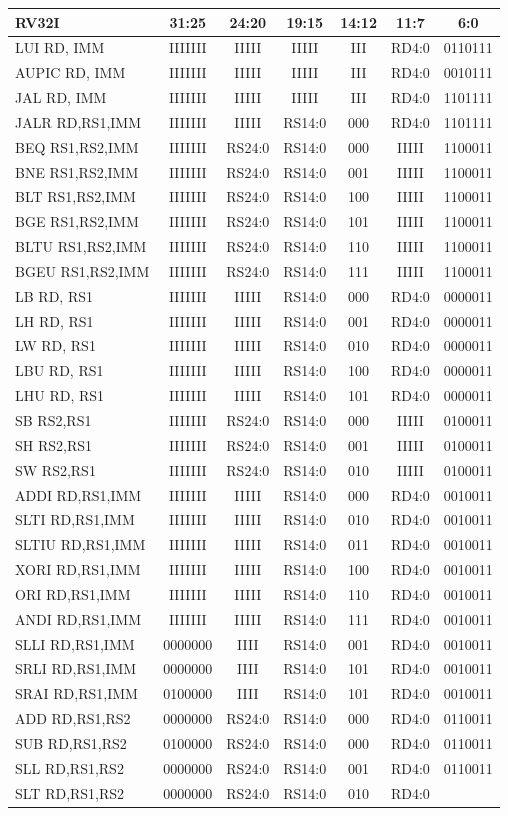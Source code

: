 \documentclass[
]{article}
\begin{document}
\begin{longtable}[]{@{}lcccccc@{}}
\toprule
RV32I & 31:25 & 24:20 & 19:15 & 14:12 & 11:7 & 6:0\tabularnewline
\midrule
\endhead
LUI RD, IMM & IIIIIII & IIIII & IIIII & III & RD4:0 &
0110111\tabularnewline
AUPIC RD, IMM & IIIIIII & IIIII & IIIII & III & RD4:0 &
0010111\tabularnewline
JAL RD, IMM & IIIIIII & IIIII & IIIII & III & RD4:0 &
1101111\tabularnewline
JALR RD,RS1,IMM & IIIIIII & IIIII & RS14:0 & 000 & RD4:0 &
1101111\tabularnewline
BEQ RS1,RS2,IMM & IIIIIII & RS24:0 & RS14:0 & 000 & IIIII &
1100011\tabularnewline
BNE RS1,RS2,IMM & IIIIIII & RS24:0 & RS14:0 & 001 & IIIII &
1100011\tabularnewline
BLT RS1,RS2,IMM & IIIIIII & RS24:0 & RS14:0 & 100 & IIIII &
1100011\tabularnewline
BGE RS1,RS2,IMM & IIIIIII & RS24:0 & RS14:0 & 101 & IIIII &
1100011\tabularnewline
BLTU RS1,RS2,IMM & IIIIIII & RS24:0 & RS14:0 & 110 & IIIII &
1100011\tabularnewline
BGEU RS1,RS2,IMM & IIIIIII & RS24:0 & RS14:0 & 111 & IIIII &
1100011\tabularnewline
LB RD, RS1 & IIIIIII & IIIII & RS14:0 & 000 & RD4:0 &
0000011\tabularnewline
LH RD, RS1 & IIIIIII & IIIII & RS14:0 & 001 & RD4:0 &
0000011\tabularnewline
LW RD, RS1 & IIIIIII & IIIII & RS14:0 & 010 & RD4:0 &
0000011\tabularnewline
LBU RD, RS1 & IIIIIII & IIIII & RS14:0 & 100 & RD4:0 &
0000011\tabularnewline
LHU RD, RS1 & IIIIIII & IIIII & RS14:0 & 101 & RD4:0 &
0000011\tabularnewline
SB RS2,RS1 & IIIIIII & RS24:0 & RS14:0 & 000 & IIIII &
0100011\tabularnewline
SH RS2,RS1 & IIIIIII & RS24:0 & RS14:0 & 001 & IIIII &
0100011\tabularnewline
SW RS2,RS1 & IIIIIII & RS24:0 & RS14:0 & 010 & IIIII &
0100011\tabularnewline
ADDI RD,RS1,IMM & IIIIIII & IIIII & RS14:0 & 000 & RD4:0 &
0010011\tabularnewline
SLTI RD,RS1,IMM & IIIIIII & IIIII & RS14:0 & 010 & RD4:0 &
0010011\tabularnewline
SLTIU RD,RS1,IMM & IIIIIII & IIIII & RS14:0 & 011 & RD4:0 &
0010011\tabularnewline
XORI RD,RS1,IMM & IIIIIII & IIIII & RS14:0 & 100 & RD4:0 &
0010011\tabularnewline
ORI RD,RS1,IMM & IIIIIII & IIIII & RS14:0 & 110 & RD4:0 &
0010011\tabularnewline
ANDI RD,RS1,IMM & IIIIIII & IIIII & RS14:0 & 111 & RD4:0 &
0010011\tabularnewline
SLLI RD,RS1,IMM & 0000000 & IIII & RS14:0 & 001 & RD4:0 &
0010011\tabularnewline
SRLI RD,RS1,IMM & 0000000 & IIII & RS14:0 & 101 & RD4:0 &
0010011\tabularnewline
SRAI RD,RS1,IMM & 0100000 & IIII & RS14:0 & 101 & RD4:0 &
0010011\tabularnewline
ADD RD,RS1,RS2 & 0000000 & RS24:0 & RS14:0 & 000 & RD4:0 &
0110011\tabularnewline
SUB RD,RS1,RS2 & 0100000 & RS24:0 & RS14:0 & 000 & RD4:0 &
0110011\tabularnewline
SLL RD,RS1,RS2 & 0000000 & RS24:0 & RS14:0 & 001 & RD4:0 &
0110011\tabularnewline
SLT RD,RS1,RS2 & 0000000 & RS24:0 & RS14:0 & 010 & RD4:0 &

\end{longtable}
\end{document}
